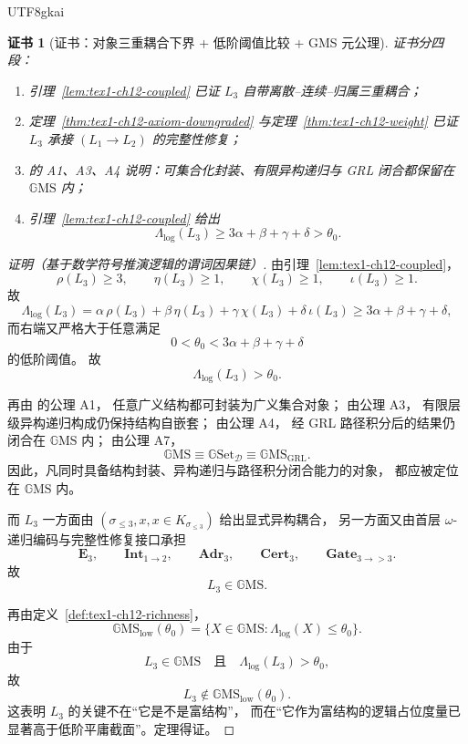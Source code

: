 \documentclass[12pt]{article}
\newtheorem{Certificate}{证书}[section]
\newcommand{\GMS}{\mathbb{G}\mathrm{MS}}
\newcommand{\GSet}{\mathbb{G}\mathrm{Set}}
\begin{document}
\begin{CJK*}{UTF8}{gkai}
\begin{Certificate}[证书：对象三重耦合下界 + 低阶阈值比较 + GMS 元公理]
\label{cert:tex1-ch12-gms}
证书分四段：
\begin{enumerate}
  \item 引理~\ref{lem:tex1-ch12-coupled} 已证 \(L_3\) 自带离散--连续--归属三重耦合；
  \item 定理~\ref{thm:tex1-ch12-axiom-downgraded} 与定理~\ref{thm:tex1-ch12-weight} 已证 \(L_3\) 承接 \((L_1\to L_2)\) 的完整性修复；
  \item \cite{RepoMetaGMSAxiom} 的 A1、A3、A4 说明：可集合化封装、有限异构递归与 GRL 闭合都保留在 \(\GMS\) 内；
  \item 引理~\ref{lem:tex1-ch12-coupled} 给出
  \[
    \Lambda_{\mathrm{log}}(L_3)\ge 3\alpha+\beta+\gamma+\delta>\theta_0.
  \]
\end{enumerate}
\end{Certificate}

\begin{proof}[证明（基于数学符号推演逻辑的谓词因果链）]
由引理~\ref{lem:tex1-ch12-coupled}，
\[
  \rho(L_3)\ge 3,\qquad
  \eta(L_3)\ge 1,\qquad
  \chi(L_3)\ge 1,\qquad
  \iota(L_3)\ge 1.
\]
故
\[
  \Lambda_{\mathrm{log}}(L_3)
  =
  \alpha\,\rho(L_3)
  +
  \beta\,\eta(L_3)
  +
  \gamma\,\chi(L_3)
  +
  \delta\,\iota(L_3)
  \ge 3\alpha+\beta+\gamma+\delta,
\]
而右端又严格大于任意满足
\[
  0<\theta_0<3\alpha+\beta+\gamma+\delta
\]
的低阶阈值。
故
\[
  \Lambda_{\mathrm{log}}(L_3)>\theta_0.
\]

再由 \cite{RepoMetaGMSAxiom} 的公理 A1，
任意广义结构都可封装为广义集合对象；
由公理 A3，
有限层级异构递归构成仍保持结构自嵌套；
由公理 A4，
经 GRL 路径积分后的结果仍闭合在 \(\GMS\) 内；
由公理 A7，
\[
  \GMS
  \equiv
  \GSet_{\mathcal D}
  \equiv
  \GMS_{\mathrm{GRL}}.
\]
因此，凡同时具备结构封装、异构递归与路径积分闭合能力的对象，
都应被定位在 \(\GMS\) 内。

而 \(L_3\) 一方面由 \((\sigma_{\le 3},x,x\in K_{\sigma_{\le3}})\) 给出显式异构耦合，
另一方面又由首层 \(\omega\)-递归编码与完整性修复接口承担
\[
  \mathbf E_3,\qquad
  \mathbf{Int}_{1\to2},\qquad
  \mathbf{Adr}_3,\qquad
  \mathbf{Cert}_3,\qquad
  \mathbf{Gate}_{3\to >3}.
\]
故
\[
  L_3\in \GMS.
\]

再由定义~\ref{def:tex1-ch12-richness}，
\[
  \GMS_{\mathrm{low}}(\theta_0)
  =
  \{X\in \GMS:\Lambda_{\mathrm{log}}(X)\le \theta_0\}.
\]
由于
\[
  L_3\in \GMS
  \quad\text{且}\quad
  \Lambda_{\mathrm{log}}(L_3)>\theta_0,
\]
故
\[
  L_3\notin \GMS_{\mathrm{low}}(\theta_0).
\]
这表明 \(L_3\) 的关键不在“它是不是富结构”，
而在“它作为富结构的逻辑占位度量已显著高于低阶平庸截面”。定理得证。
\end{proof}


\end{CJK*}
\end{document}
